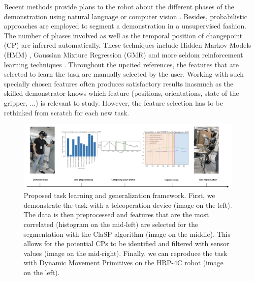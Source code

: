 \documentclass[conference]{IEEEtran}
\begin{document}
Recent methods provide plans to the robot about the different phases of the demonstration using natural language or computer vision \cite{caccavale_kinesthetic_2019} \cite{saran_enhancing_2019}. Besides, probabilistic approaches are employed to segment a demonstration in a unsupervised fashion. The number of phases involved as well as the temporal position of changepoint (CP) are inferred automatically. These techniques include Hidden Markov Models (HMM) \cite{niekum_learning_2015}, Gaussian Mixture Regression (GMR) \cite{calinon_learning_2010} \cite{calinon_learning_2007} and more seldom reinforcement learning techniques \cite{kroemer_towards_2015}. Throughout the upcited references, the features that are selected to learn the task are manually selected by the user. Working with such specially chosen features often produces satisfactory results inasmuch as the skilled demonstrator knows which feature (positions, orientations, state of the gripper, ...) is relevant to study. However, the feature selection has to be rethinked from scratch for each new task. \newline

\begin{figure}[t]
  \centering
  \includegraphics[width=\linewidth]{img/framework.png}
  \caption{Proposed task learning and generalization framework. First, we demonstrate the task with a teleoperation device (image on the left). The data is then preprocessed and features that are the most correlated (histogram on the mid-left) are selected for the segmentation with the ClaSP algorithm (image on the middle). This allows for the potential CPs to be identified and filtered with sensor values (image on the mid-right). Finally, we can reproduce the task with Dynamic Movement Primitives on the HRP-4C robot (image on the left).}
  \label{fig:framework}
\end{figure}

\end{document}
